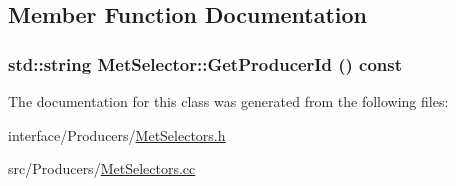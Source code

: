 \subsection{Member Function Documentation}
\hypertarget{classMetSelector_ad28e5f2667e2de54aa810bc21676bb8e}{
\subsubsection[{GetProducerId}]{\setlength{\rightskip}{0pt plus 5cm}std::string MetSelector::GetProducerId () const}}
\label{classMetSelector_ad28e5f2667e2de54aa810bc21676bb8e}


The documentation for this class was generated from the following files:\begin{DoxyCompactItemize}
\item 
interface/Producers/\hyperlink{MetSelectors_8h}{MetSelectors.h}\item 
src/Producers/\hyperlink{MetSelectors_8cc}{MetSelectors.cc}\end{DoxyCompactItemize}
